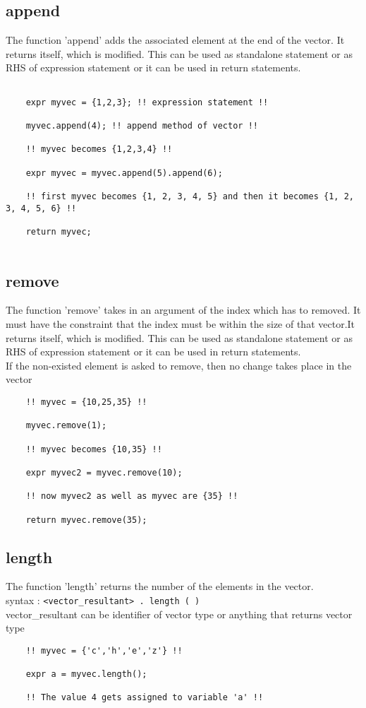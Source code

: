 \documentclass[journal, 18pt]{report}
\begin{document}
\subsection{append}
The function 'append' adds the associated element at the end of the vector. It returns itself, which is modified. This can be used as standalone statement or as RHS of expression statement or it can be used in return statements.
\begin{lstlisting}

    expr myvec = {1,2,3}; !! expression statement !!
    
    myvec.append(4); !! append method of vector !!
    
    !! myvec becomes {1,2,3,4} !!

    expr myvec = myvec.append(5).append(6);

    !! first myvec becomes {1, 2, 3, 4, 5} and then it becomes {1, 2, 3, 4, 5, 6} !!

    return myvec;
    
\end{lstlisting}
\subsection{remove}
The function 'remove' takes in an argument of the index which has to removed. It must have the constraint that the index must be within the size of that vector.It returns itself, which is modified. This can be used as standalone statement or as RHS of expression statement or it can be used in return statements.\\

If the non-existed element is asked to remove, then no change takes place in the vector
\begin{lstlisting}
    !! myvec = {10,25,35} !!
    
    myvec.remove(1); 

    !! myvec becomes {10,35} !!

    expr myvec2 = myvec.remove(10);

    !! now myvec2 as well as myvec are {35} !!

    return myvec.remove(35);
\end{lstlisting}
\subsection{length}
The function 'length' returns the number of the elements in the vector.\\
syntax : \texttt{<vector\_resultant> . length ( )} \\
vector\_resultant can be identifier of vector type or anything that returns vector type
\begin{lstlisting}
    !! myvec = {'c','h','e','z'} !!
    
    expr a = myvec.length();
    
    !! The value 4 gets assigned to variable 'a' !!
\end{lstlisting}
\end{document}
